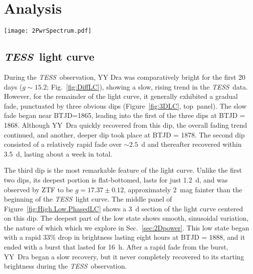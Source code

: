 \documentclass[twocolumn]{aastex63}
\newcommand{\orbit}{$\Omega$}
\newcommand{\spin}{$\omega$}
\newcommand{\beat}{$\omega$-$\Omega$}
\newcommand{\doubleorbit}{2$\Omega$}
\newcommand{\doublespin}{2$\omega$}
\newcommand{\doublebeat}{2($\omega$-$\Omega)$}
\newcommand{\TESS}{\textit{TESS}}
\begin{document}
\section{Analysis}



\begin{figure*}
\centering
\texttt{[image: 2PwrSpectrum.pdf]}
\caption{ {\bf Top:} YY Dra's power spectrum of the entire \TESS\ light curve, with very clear \orbit, \doubleorbit, \beat, \doublebeat, and \doublespin\ frequencies. The spin frequency \spin\ was below the noise level, but its expected position is labeled in red. The comparatively high intensity of \beat\ and its harmonics relative to \spin\ and \doublespin\ is characteristic of stream-fed accretion in the \citet{Ferrario99} models. {\bf Bottom:} Power spectrum during the 28~h low state shown in Fig.~\ref{fig:High.Low.PhasedLC}. The only remaining periodic variation occurs at \doubleorbit\ and is attributable to ellipsoidal variations. 
}
\label{fig:PwrSpectrum}
\end{figure*}

\subsection{\TESS\ light curve}


During the \TESS\ observation, YY Dra was comparatively bright for the first 20 days ($g\sim15.2$; Fig.~\ref{fig:DiffLC}), showing a slow, rising trend in the \TESS\ data. However, for the remainder of the light curve, it generally exhibited a gradual fade, punctuated by three obvious dips (Figure~\ref{fig:3DLC}, top~panel). The slow fade began near BTJD=1865, leading into the first of the three dips at BTJD = 1868. Although YY~Dra quickly recovered from this dip, the overall fading trend continued, and another, deeper dip took place at BTJD = 1878. The second dip consisted of a relatively rapid fade over $\sim2.5$~d and thereafter recovered within 3.5~d, lasting about a week in total. 

The third dip is the most remarkable feature of the light curve. Unlike the first two dips, its deepest portion is flat-bottomed, lasts for just 1.2~d, and was observed by ZTF to be $g=17.37\pm0.12$, approximately 2~mag fainter than the beginning of the \TESS\ light curve. The middle panel of Figure~\ref{fig:High.Low.PhasedLC} shows a 3~d section of the light curve centered on this dip. The deepest part of the low state shows smooth, sinusoidal variation, the nature of which which we explore in Sec.~\ref{sec:2Dpower}. This low state began with a rapid 33\% drop in brightness lasting eight hours at BTJD = 1888, and it ended with a burst that lasted for 16~h. After a rapid fade from the burst, YY~Dra began a slow recovery, but it never completely recovered to its starting brightness during the \TESS\ observation.
\end{document}
